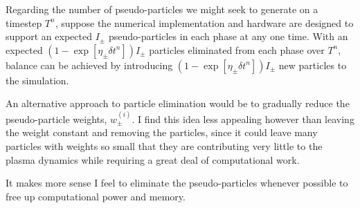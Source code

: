     \shortline

    Regarding the number of pseudo-particles we might seek to generate on a timestep $T^{n}$, suppose the numerical implementation and hardware are designed to support an expected $I_{\pm}$ pseudo-particles in each phase at any one time. With an expected $(1 - \exp\left[\eta_{\pm}\delta t^{n}\right])I_{\pm}$ particles eliminated from each phase over $T^{n}$, balance can be achieved by introducing $(1 - \exp\left[\eta_{\pm}\delta t^{n}\right])I_{\pm}$ new particles to the simulation.

    \shortline

    \begin{remark}
        An alternative approach to particle elimination would be to gradually reduce the pseudo-particle weights, $w_{\pm}^{(i)}$. I find this idea less appealing however than leaving the weight constant and removing the particles, since it could leave many particles with weights so small that they are contributing very little to the plasma dynamics while requiring a great deal of computational work.
        
        It makes more sense I feel to eliminate the pseudo-particles whenever possible to free up computational power and memory.
    \end{remark}
    